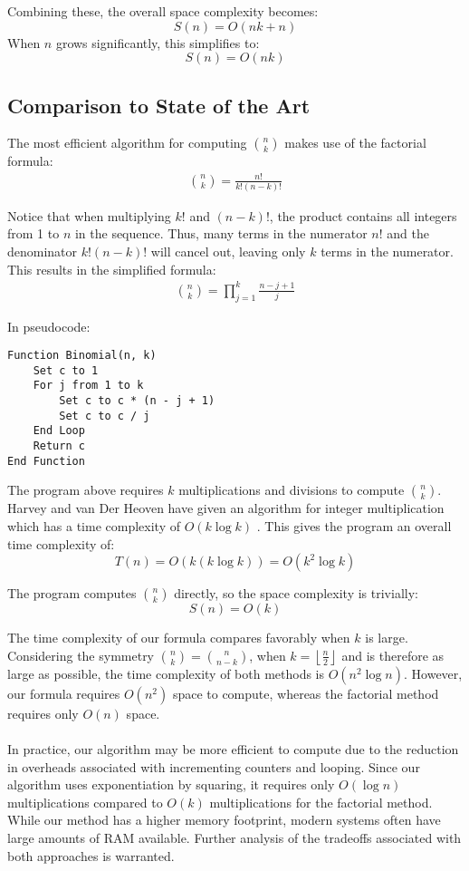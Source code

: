 \documentclass{article}
\theoremstyle{plain}
\theoremstyle{definition}
\begin{document}
Combining these, the overall space complexity becomes:
\[
S(n) = O(nk + n)
\]
When \(n\) grows significantly, this simplifies to:
\[
S(n) = O(nk)
\]

\subsection{Comparison to State of the Art}
The most efficient algorithm for computing $\binom{n}{k}$ makes use of the factorial formula:
\begin{align}
    \binom{n}{k} = \frac{n!}{k!(n-k)!}
\end{align}

Notice that when multiplying $k!$ and $(n-k)!$, the product contains all integers from 1 to $n$ in the sequence. Thus, many terms in the numerator $n!$ and the denominator $k!(n-k)!$ will cancel out, leaving only $k$ terms in the numerator. This results in the simplified formula:
\begin{align}
    \binom{n}{k} = \prod_{j=1}^{k} \frac{n-j+1}{j} 
\end{align}

In pseudocode:

\begin{verbatim}
Function Binomial(n, k)
    Set c to 1
    For j from 1 to k
        Set c to c * (n - j + 1)
        Set c to c / j
    End Loop
    Return c
End Function
\end{verbatim}

The program above requires $k$ multiplications and divisions to compute $\binom{n}{k}$. Harvey and van Der Heoven have given an algorithm for integer multiplication which has a time complexity of $O(k \log{k})$ \cite{harveyvanderhoeven2021}. This gives the program an overall time complexity of:
\[
T(n) = O(k (k \log{k})) = O(k^2 \log{k})
\]

The program computes $\binom{n}{k}$ directly, so the space complexity is trivially:
\[
S(n) = O(k)
\]

The time complexity of our formula compares favorably when $k$ is large. Considering the symmetry $\binom{n}{k} = \binom{n}{n-k}$, when $k = \left\lfloor \frac{n}{2} \right\rfloor$ and is therefore as large as possible, the time complexity of both methods is $O(n^2 \log{n})$. However, our formula requires $O(n^2)$ space to compute, whereas the factorial method requires only $O(n)$ space.
\\
\\
In practice, our algorithm may be more efficient to compute due to the reduction in overheads associated with incrementing counters and looping. Since our algorithm uses exponentiation by squaring, it requires only $O(\log{n})$ multiplications compared to $O(k)$ multiplications for the factorial method. While our method has a higher memory footprint, modern systems often have large amounts of RAM available. Further analysis of the tradeoffs associated with both approaches is warranted.
\end{document}
